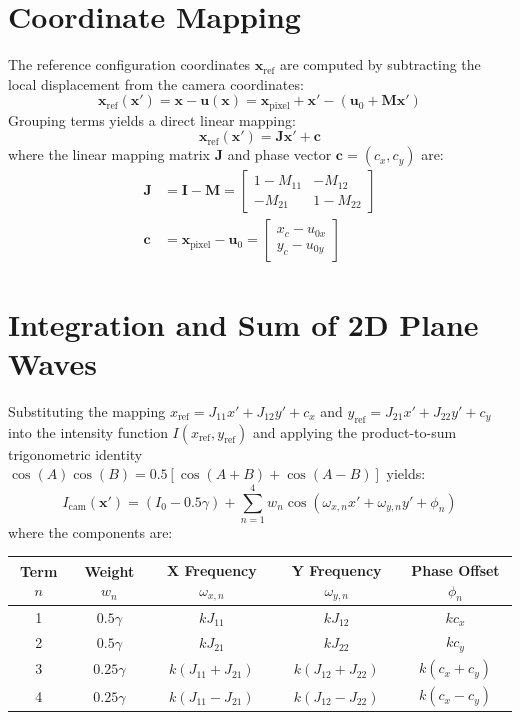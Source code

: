 \documentclass[11pt,a4paper]{article}
\begin{document}
\section{Coordinate Mapping}
The reference configuration coordinates $\mathbf{x}_{\text{ref}}$ are computed by subtracting the local displacement from the camera coordinates:
\begin{equation}
\mathbf{x}_{\text{ref}}(\mathbf{x}') = \mathbf{x} - \mathbf{u}(\mathbf{x}) = \mathbf{x}_{\text{pixel}} + \mathbf{x}' - (\mathbf{u}_0 + \mathbf{M} \mathbf{x}')
\end{equation}
Grouping terms yields a direct linear mapping:
\begin{equation}
\mathbf{x}_{\text{ref}}(\mathbf{x}') = \mathbf{J} \mathbf{x}' + \mathbf{c}
\end{equation}
where the linear mapping matrix $\mathbf{J}$ and phase vector $\mathbf{c} = (c_x, c_y)$ are:
\begin{align}
\mathbf{J} &= \mathbf{I} - \mathbf{M} = \begin{bmatrix} 1 - M_{11} & -M_{12} \\ -M_{21} & 1 - M_{22} \end{bmatrix} \\
\mathbf{c} &= \mathbf{x}_{\text{pixel}} - \mathbf{u}_0 = \begin{bmatrix} x_c - u_{0x} \\ y_c - u_{0y} \end{bmatrix}
\end{align}

\section{Integration and Sum of 2D Plane Waves}
Substituting the mapping $x_{\text{ref}} = J_{11} x' + J_{12} y' + c_x$ and $y_{\text{ref}} = J_{21} x' + J_{22} y' + c_y$ into the intensity function $I(x_{\text{ref}}, y_{\text{ref}})$ and applying the product-to-sum trigonometric identity $\cos(A)\cos(B) = 0.5[\cos(A+B) + \cos(A-B)]$ yields:
\begin{equation}
I_{\text{cam}}(\mathbf{x}') = (I_0 - 0.5\gamma) + \sum_{n=1}^4 w_n \cos(\omega_{x,n} x' + \omega_{y,n} y' + \phi_n)
\end{equation}
where the components are:
\begin{table}[h]
\centering
\begin{tabular}{ccccc}
\toprule
Term $n$ & Weight $w_n$ & X Frequency $\omega_{x,n}$ & Y Frequency $\omega_{y,n}$ & Phase Offset $\phi_n$ \\
\midrule
1 & $0.5\gamma$  & $k J_{11}$ & $k J_{12}$ & $k c_x$ \\
2 & $0.5\gamma$  & $k J_{21}$ & $k J_{22}$ & $k c_y$ \\
3 & $0.25\gamma$ & $k (J_{11} + J_{21})$ & $k (J_{12} + J_{22})$ & $k (c_x + c_y)$ \\
4 & $0.25\gamma$ & $k (J_{11} - J_{21})$ & $k (J_{12} - J_{22})$ & $k (c_x - c_y)$ \\
\bottomrule
\end{tabular}
\end{table}
\end{document}
